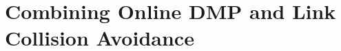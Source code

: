 \documentclass[../main.tex]{subfiles}
\begin{document}
\section{Combining Online DMP and Link Collision Avoidance}
\label{sec:combining}
\end{document}
